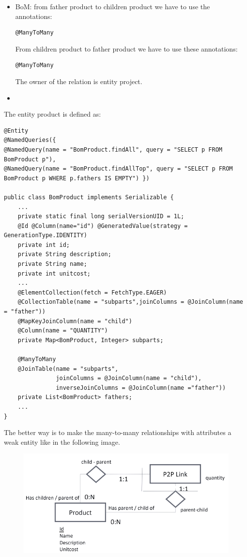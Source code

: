 \documentclass[12pt, a4paper]{report}
\begin{document}
        \begin{itemize}
            \item BoM: from father product to children product we have to use the annotations: 
                \begin{lstlisting}[style=Java]
@ManyToMany
                \end{lstlisting}
                From children product to father product we have to use these annotations: 
                \begin{lstlisting}[style=Java]
@ManyToMany
                \end{lstlisting}
                The owner of the relation is entity project. 
            \item 
        \end{itemize}
        The entity product is defined as:  
            \begin{lstlisting}[style=Java]
@Entity
@NamedQueries({
@NamedQuery(name = "BomProduct.findAll", query = "SELECT p FROM BomProduct p"),
@NamedQuery(name = "BomProduct.findAllTop", query = "SELECT p FROM BomProduct p WHERE p.fathers IS EMPTY") })

public class BomProduct implements Serializable {
    ...
    private static final long serialVersionUID = 1L;
    @Id @Column(name="id") @GeneratedValue(strategy = GenerationType.IDENTITY)
    private int id;
    private String description;
    private String name;
    private int unitcost;
    ...
    @ElementCollection(fetch = FetchType.EAGER)
    @CollectionTable(name = "subparts",joinColumns = @JoinColumn(name = "father"))
    @MapKeyJoinColumn(name = "child")
    @Column(name = "QUANTITY")
    private Map<BomProduct, Integer> subparts;
    
    @ManyToMany
    @JoinTable(name = "subparts",
               joinColumns = @JoinColumn(name = "child"),
               inverseJoinColumns = @JoinColumn(name ="father"))
    private List<BomProduct> fathers;
    ...            
}
            \end{lstlisting}
        The better way is to make the many-to-many relationships with attributes a weak entity like in the following image. 
        \begin{figure}[H]
            \centering
            \includegraphics[width=0.6\linewidth]{images/BoMweak.png}
        \end{figure}
\end{document}
